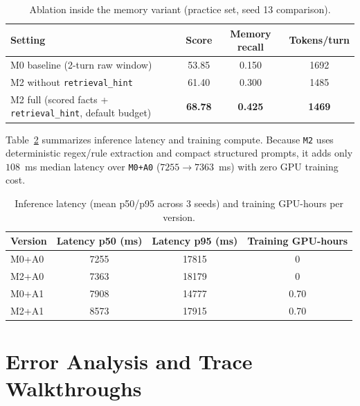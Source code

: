 \documentclass[11pt]{article}
\newcommand{\groupid}{G14}
\begin{document}
\begin{table}[h]
\centering\small
\caption{Ablation inside the memory variant (practice set, seed 13 comparison).}
\label{tab:\groupid-ablation}
\begin{tabular}{lccc}
\toprule
Setting & Score & Memory recall & Tokens/turn \\
\midrule
M0 baseline (2-turn raw window) & 53.85 & 0.150 & 1692 \\
M2 without \texttt{retrieval\_hint} & 61.40 & 0.300 & 1485 \\
M2 full (scored facts + \texttt{retrieval\_hint}, default budget) & \textbf{68.78} & \textbf{0.425} & \textbf{1469} \\
\bottomrule
\end{tabular}
\end{table}

Table~\ref{tab:\groupid-cost} summarizes inference latency and training compute. Because \texttt{M2} uses deterministic regex/rule extraction and compact structured prompts, it adds only $108$~ms median latency over \texttt{M0+A0} ($7255 \rightarrow 7363$~ms) with zero GPU training cost.

\begin{table}[h]
\centering\small
\caption{Inference latency (mean p50/p95 across 3 seeds) and training GPU-hours per version.}
\label{tab:\groupid-cost}
\begin{tabular}{lccc}
\toprule
Version & Latency p50 (ms) & Latency p95 (ms) & Training GPU-hours \\
\midrule
M0+A0 & 7255 & 17815 & 0 \\
M2+A0 & 7363 & 18179 & 0 \\
M0+A1 & 7908 & 14777 & 0.70 \\
M2+A1 & 8573 & 17915 & 0.70 \\
\bottomrule
\end{tabular}
\end{table}

\section{Error Analysis and Trace Walkthroughs}
\label{sec:\groupid-analysis}
\end{document}
